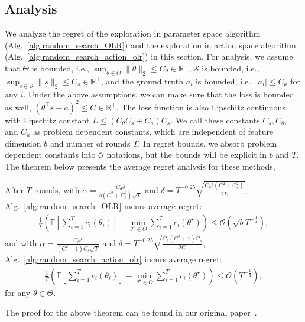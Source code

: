 \subsection{Analysis}
We analyze the regret of the exploration in parameter space algorithm (Alg.~\ref{alg:random_search_OLR}) and the exploration in action space algorithm (Alg.~\ref{alg:random_search_action_olr}) in this section. For analysis, we assume that $\Theta$ is bounded, i.e., $\sup_{\theta\in\Theta}\|\theta\|_2 \leq C_{\theta}\in\mathbb{R}^+$, $\mathcal{S}$ is bounded, i.e., $\sup_{s\in\mathcal{S}}\|s\|_2 \leq C_s\in\mathbb{R}^+$, and the ground truth $a_i$ is bounded, i.e., $|a_i|\leq C_{a}$ for any $i$. Under the above assumptions, we can make sure that the loss is bounded as well, $(\theta^{\top}s - a)^2 \leq C\in\mathbb{R}^{+}$. The loss function is also Lipschitz continuous with Lipschitz constant $L \leq (C_{\theta}C_{s} + C_{a})C_{s}$. We call these constants $C_{s}, C_{\theta}$, and $C_{a}$ as problem dependent constants, which are independent of feature dimension $b$ and number of rounds $T$.
%
In regret bounds, we absorb problem dependent constants into $\mathcal{O}$ notations, but the bounds will be explicit in $b$ and $T$. The theorem below presents the average regret analysis for these methods,

\begin{theorem}
After $T$ rounds, %
%
%
%
%
with $\alpha = \frac{{C_{\theta}}\delta}{b(C^2+C_{s}^2)\sqrt{T}}$ and $\delta = T^{-0.25}\sqrt{\frac{C_{\theta}b(C^2+C_{s}^2)}{2L}}$, Alg.~\ref{alg:random_search_OLR} incurs average regret:
\begin{align}
\label{eq:random_para}
    \frac{1}{T}(\mathbb{E}[\sum_{i=1}^T c_i(\theta_i)] - \min_{\theta^\star
  \in \Theta}\sum_{i=1}^T c_i(\theta^\star)) \leq %
    \mathcal{O}(\sqrt{b}T^{-\frac{1}{4}}),
\end{align}
and with $\alpha = \frac{C_{\theta}\delta}{(C^2+1)C_{s}\sqrt{T}}$ and $\delta = T^{-0.25}\sqrt{\frac{C_{\theta}(C^2+1)C_{s}}{2C}}$, Alg.~\ref{alg:random_search_action_olr} incurs average regret:
\begin{align}
\label{eq:random_action}
    \frac{1}{T}(\mathbb{E}[\sum_{i=1}^T c_i(\theta_i)] -
  \min_{\theta^\star \in \Theta}\sum_{i=1}^T c_i(\theta^\star)) \leq %
    \mathcal{O}(T^{-\frac{1}{4}}),
\end{align} for any $\theta\in\Theta$.
\label{thm:online_linear_regression}
\end{theorem}

The proof for the above theorem can be found in our original paper~\cite{aistats19}.

